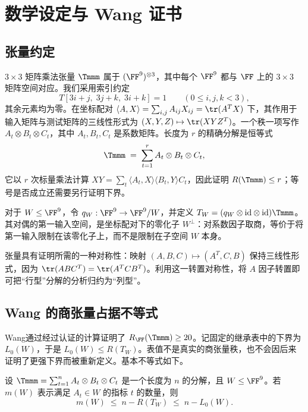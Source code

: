\documentclass[11pt,a4paper]{article}
\begin{document}


\section{数学设定与 Wang 证书}\label{sec:setting}

\subsection{张量约定}

$3\times3$ 矩阵乘法张量 $\Tmmm$ 属于 $(\FF^9)^{\otimes3}$，其中每个 $\FF^9$ 都与 $\FF$ 上的 $3\times3$ 矩阵空间对应。我们采用索引约定
\begin{equation}\label{eq:tensor}
  T[3i+j,\;3j+k,\;3i+k] = 1 \qquad (0\le i,j,k<3),
\end{equation}
其余元素均为零。在坐标配对 $\langle A,X\rangle=\sum_{i,j}A_{ij}X_{ij}=\tr(A^TX)$ 下，其作用于输入矩阵与测试矩阵的三线性形式为 $(X,Y,Z)\mapsto\tr(XYZ^T)$。一个秩一项写作 $A_t\otimes B_t\otimes C_t$，其中 $A_t,B_t,C_t$ 是系数矩阵。长度为 $r$ 的精确分解是恒等式
\begin{equation}\label{eq:general-decomposition}
  \Tmmm \;=\; \sum_{t=1}^r A_t\otimes B_t\otimes C_t,
\end{equation}
它以 $r$ 次标量乘法计算 $XY=\sum_t\langle A_t,X\rangle\langle B_t,Y\rangle C_t$，因此证明 $R(\Tmmm)\le r$；等号是否成立还需要另行证明下界。

对于 $W\le\FF^9$，令 $q_W:\FF^9\to\FF^9/W$，并定义 $T_W=(q_W\otimes\mathrm{id}\otimes\mathrm{id})\Tmmm$。其对偶的第一输入空间，是坐标配对下的零化子 $W^\perp$：对系数因子取商，等价于将第一输入限制在该零化子上，而不是限制在子空间 $W$ 本身。

张量具有证明所需的一种对称性：映射 $(A,B,C)\mapsto(A^T,C,B)$ 保持三线性形式，因为 $\tr(ABC^T)=\tr(A^TCB^T)$。利用这一转置对称性，将 $A$ 因子转置即可把“行型”分解的分析归约为“列型”。

\subsection{Wang 的商张量占据不等式}

Wang\cite{wangautomated}通过经过认证的计算证明了 $R_{\FF}(\Tmmm)\ge20$。记固定的继承表中的下界为 $L_0(W)$，于是 $L_0(W)\le R(T_W)$。表值不是真实的商张量秩，也不会因后来证明了更强下界而被重新定义。基本不等式如下。

\begin{proposition}[占据不等式]\label{prop:occupation}
  设 $\Tmmm=\sum_{t=1}^n A_t\otimes B_t\otimes C_t$ 是一个长度为 $n$ 的分解，且 $W\le\FF^9$。若 $m(W)$ 表示满足 $A_t\in W$ 的指标 $t$ 的数量，则
  \begin{equation}\label{eq:occ}
    m(W)\;\le\; n-R(T_W)\;\le\;n-L_0(W).
  \end{equation}
\end{proposition}
\end{document}

